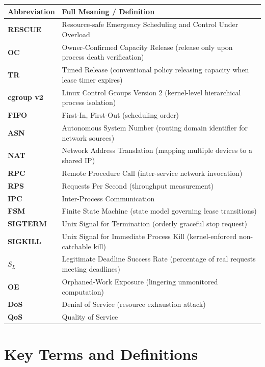 \documentclass[12pt,a4paper]{report}
\begin{document}
\begin{table}[H]
\centering
\begin{tabularx}{\textwidth}{l X}
\toprule
\textbf{Abbreviation} & \textbf{Full Meaning / Definition} \\
\midrule
\textbf{RESCUE} & Resource-safe Emergency Scheduling and Control Under Overload \\
\textbf{OC} & Owner-Confirmed Capacity Release (release only upon process death verification) \\
\textbf{TR} & Timed Release (conventional policy releasing capacity when lease timer expires) \\
\textbf{cgroup v2} & Linux Control Groups Version 2 (kernel-level hierarchical process isolation) \\
\textbf{FIFO} & First-In, First-Out (scheduling order) \\
\textbf{ASN} & Autonomous System Number (routing domain identifier for network sources) \\
\textbf{NAT} & Network Address Translation (mapping multiple devices to a shared IP) \\
\textbf{RPC} & Remote Procedure Call (inter-service network invocation) \\
\textbf{RPS} & Requests Per Second (throughput measurement) \\
\textbf{IPC} & Inter-Process Communication \\
\textbf{FSM} & Finite State Machine (state model governing lease transitions) \\
\textbf{SIGTERM} & Unix Signal for Termination (orderly graceful stop request) \\
\textbf{SIGKILL} & Unix Signal for Immediate Process Kill (kernel-enforced non-catchable kill) \\
$S_L$ & Legitimate Deadline Success Rate (percentage of real requests meeting deadlines) \\
\textbf{OE} & Orphaned-Work Exposure (lingering unmonitored computation) \\
\textbf{DoS} & Denial of Service (resource exhaustion attack) \\
\textbf{QoS} & Quality of Service \\
\bottomrule
\end{tabularx}
\end{table}

\section*{Key Terms and Definitions}
\end{document}
